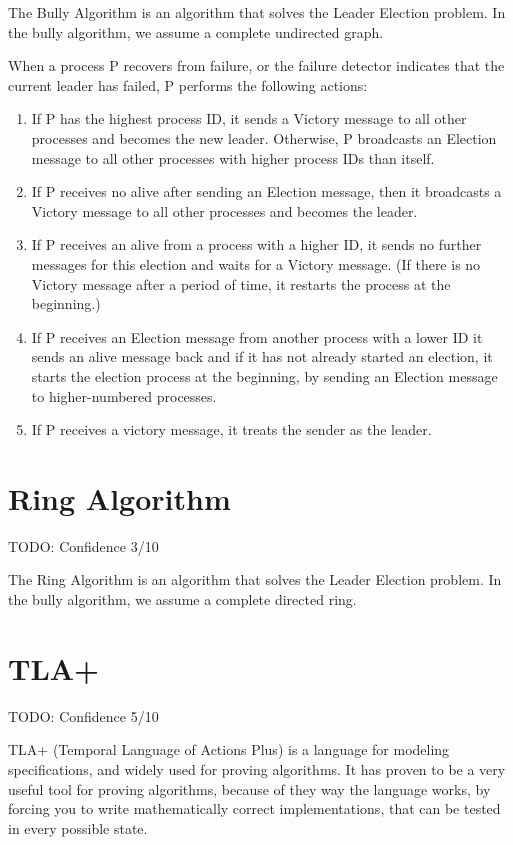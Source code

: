 \documentclass{report}
\begin{document}
The Bully Algorithm is an algorithm that solves the Leader Election problem. In the bully algorithm, we assume a complete undirected graph.


When a process P recovers from failure, or the failure detector indicates that the current leader has failed, P performs the following actions:

\begin{enumerate}
\item If P has the highest process ID, it sends a Victory message to all other processes and becomes the new leader. Otherwise, P broadcasts an Election message to all other processes with higher process IDs than itself.
\item If P receives no alive after sending an Election message, then it broadcasts a Victory message to all other processes and becomes the leader.
\item If P receives an alive from a process with a higher ID, it sends no further messages for this election and waits for a Victory message. (If there is no Victory message after a period of time, it restarts the process at the beginning.)
\item If P receives an Election message from another process with a lower ID it sends an alive message back and if it has not already started an election, it starts the election process at the beginning, by sending an Election message to higher-numbered processes.
\item If P receives a victory message, it treats the sender as the leader.
\end{enumerate}

\section{Ring Algorithm}
TODO: Confidence 3/10

The Ring Algorithm is an algorithm that solves the Leader Election problem. In the bully algorithm, we assume a complete directed ring.


\section{TLA+}
TODO: Confidence 5/10

TLA+ (Temporal Language of Actions Plus) is a language for modeling specifications, and widely used for proving algorithms. It has proven to be a very useful tool for proving algorithms, because of they way the language works, by forcing you to write mathematically correct implementations, that can be tested in every possible state.
\end{document}
